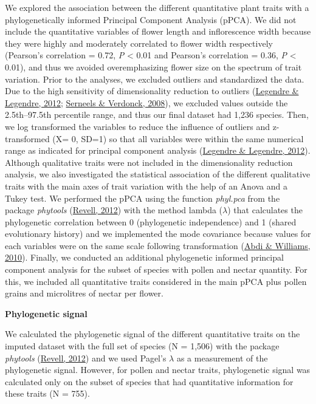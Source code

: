 \documentclass[
  12pt,
  a4paper,
]{article}
\begin{document}
We explored the association between the different quantitative plant traits with a phylogenetically informed Principal Component Analysis (pPCA). We did not include the quantitative variables of flower length and inflorescence width because they were highly and moderately correlated to flower width respectively (Pearson's correlation = 0.72, \emph{P} \textless{} 0.01 and Pearson's correlation = 0.36, \emph{P} \textless{} 0.01), and thus we avoided overemphasizing flower size on the spectrum of trait variation. Prior to the analyses, we excluded outliers and standardized the data. Due to the high sensitivity of dimensionality reduction to outliers (\protect\hyperlink{ref-legendre2012}{Legendre \& Legendre, 2012}; \protect\hyperlink{ref-serneels2008}{Serneels \& Verdonck, 2008}), we excluded values outside the 2.5th--97.5th percentile range, and thus our final dataset had 1,236 species. Then, we log transformed the variables to reduce the influence of outliers and z-transformed (X= 0, SD=1) so that all variables were within the same numerical range as indicated for principal component analysis (\protect\hyperlink{ref-legendre2012}{Legendre \& Legendre, 2012}). Although qualitative traits were not included in the dimensionality reduction analysis, we also investigated the statistical association of the different qualitative traits with the main axes of trait variation with the help of an Anova and a Tukey test. We performed the pPCA using the function \emph{phyl.pca} from the package \emph{phytools} (\protect\hyperlink{ref-revell2012}{Revell, 2012}) with the method lambda (\(\lambda\)) that calculates the phylogenetic correlation between 0 (phylogenetic independence) and 1 (shared evolutionary history) and we implemented the mode covariance because values for each variables were on the same scale following transformation (\protect\hyperlink{ref-abdi2010}{Abdi \& Williams, 2010}). Finally, we conducted an additional phylogenetic informed principal component analysis for the subset of species with pollen and nectar quantity. For this, we included all quantitative traits considered in the main pPCA plus pollen grains and microlitres of nectar per flower.

\textbf{Phylogenetic signal}

We calculated the phylogenetic signal of the different quantitative traits on the imputed dataset with the full set of species (N = 1,506) with the package \emph{phytools} (\protect\hyperlink{ref-revell2012}{Revell, 2012}) and we used Pagel's \(\lambda\) as a measurement of the phylogenetic signal. However, for pollen and nectar traits, phylogenetic signal was calculated only on the subset of species that had quantitative information for these traits (N = 755).
\end{document}
